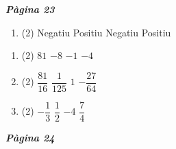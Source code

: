 \documentclass[a4paper, pdf, twoside]{book}
\begin{document}
\begin{multicols}{2}

{\textbf{\em Pàgina 23}} \hrulefill
\begin{enumerate}
\vspace{0.25cm}



 \item[\fontfamily{phv}\selectfont\color{blue}\textbf{1}. ] 
 \begin{tasks}[column-sep=1em, item-indent=1.3333em](2)
	 \task Negatiu
	 \task Positiu
	 \task Negatiu
	 \task Positiu
\end{tasks}
 \end{enumerate}
\begin{enumerate}
\vspace{0.25cm}



 \item[\fontfamily{phv}\selectfont\color{blue}\textbf{2}. ] 
 \begin{tasks}[column-sep=1em, item-indent=1.3333em](2)
	 \task $81$
	 \task $-8$
	 \task $-1$
	 \task $-4$
\end{tasks}
\vspace{0.25cm}



 \item[\fontfamily{phv}\selectfont\color{blue}\textbf{3}. ] 
 \begin{tasks}[column-sep=1em, item-indent=1.3333em](2)
	 \task $\dfrac {81}{16}$
	 \task $\dfrac {1}{125}$
	 \task $1$
	 \task $-\dfrac {27}{64}$
\end{tasks}
\vspace{0.25cm}



 \item[\fontfamily{phv}\selectfont\color{blue}\textbf{4}. ] 
 \begin{tasks}[column-sep=1em, item-indent=1.3333em](2)
	 \task $-\dfrac {1}{3}$
	 \task $\dfrac {1}{2}$
	 \task $-4$
	 \task $\dfrac {7}{4}$
\end{tasks}
 \end{enumerate}
\vspace{0.3cm}


{\textbf{\em Pàgina 24}} \hrulefill
\begin{enumerate}
\vspace{0.25cm}



\end{enumerate}
\end{multicols}
\end{document}

